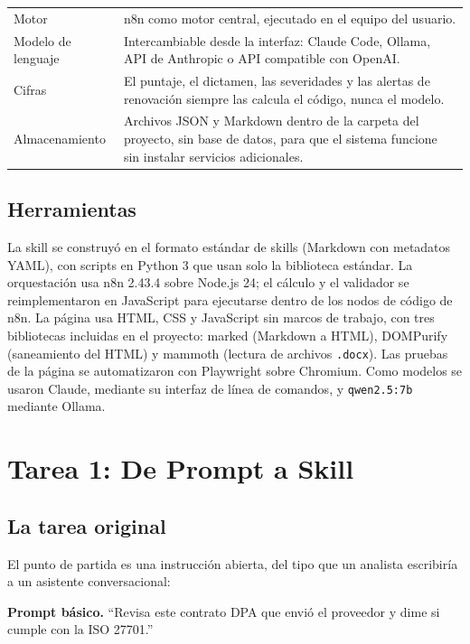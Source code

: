 \documentclass[12pt,letterpaper]{article}
\begin{document}
\begin{table}[H]
\begin{tabularx}{\linewidth}{@{}L{4.2cm} Y@{}}
Motor & n8n como motor central, ejecutado en el equipo del usuario. \\
Modelo de lenguaje & Intercambiable desde la interfaz: Claude Code, Ollama, API de Anthropic o API compatible con OpenAI. \\
Cifras & El puntaje, el dictamen, las severidades y las alertas de renovación siempre las calcula el código, nunca el modelo. \\
Almacenamiento & Archivos JSON y Markdown dentro de la carpeta del proyecto, sin base de datos, para que el sistema funcione sin instalar servicios adicionales. \\
\bottomrule
\end{tabularx}
\end{table}

\subsection{Herramientas}

La skill se construyó en el formato estándar de skills (Markdown con metadatos YAML), con scripts en Python 3 que usan solo la biblioteca estándar. La orquestación usa n8n 2.43.4 sobre Node.js 24; el cálculo y el validador se reimplementaron en JavaScript para ejecutarse dentro de los nodos de código de n8n. La página usa HTML, CSS y JavaScript sin marcos de trabajo, con tres bibliotecas incluidas en el proyecto: marked (Markdown a HTML), DOMPurify (saneamiento del HTML) y mammoth (lectura de archivos \texttt{.docx}). Las pruebas de la página se automatizaron con Playwright sobre Chromium. Como modelos se usaron Claude, mediante su interfaz de línea de comandos, y \texttt{qwen2.5:7b} mediante Ollama.

\section{Tarea 1: De Prompt a Skill}

\subsection{La tarea original}

El punto de partida es una instrucción abierta, del tipo que un analista escribiría a un asistente conversacional:

\par\noindent \textbf{Prompt básico.} ``Revisa este contrato DPA que envió el proveedor y dime si cumple con la ISO 27701.''
\par
\end{document}
